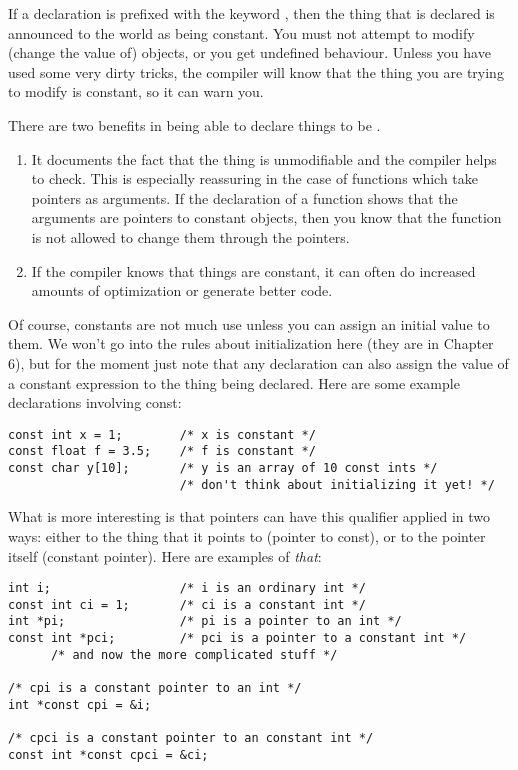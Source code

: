    If a declaration is prefixed with the keyword \const, then
    the thing that is declared is announced to the world as being constant.
    You must not attempt to modify (change the value of) \const{}
    objects, or you get undefined behaviour. Unless you have used some very
    dirty tricks, the compiler will know that the thing you are trying to
    modify is constant, so it can warn you.


   There are two benefits in being able to declare things to be
    \const.


   \begin{enumerate}
    \item It documents the fact that the thing is unmodifiable and the
     compiler helps to check. This is especially reassuring in the case
     of functions which take pointers as arguments. If the declaration
     of a function shows that the arguments are pointers to constant
     objects, then you know that the function is not allowed to change
     them through the pointers.

    \item If the compiler knows that things are constant, it can often do
     increased amounts of optimization or generate better code.
   \end{enumerate}

   Of course, constants are not much use unless you can assign an initial
    value to them. We won't go into the rules about initialization here
    (they are in Chapter 6), but for the moment just note that
    any declaration can also assign the value of a constant expression to
    the thing being declared. Here are some example declarations involving
    const:


   \begin{Verbatim}
const int x = 1;        /* x is constant */
const float f = 3.5;    /* f is constant */
const char y[10];       /* y is an array of 10 const ints */
                        /* don't think about initializing it yet! */
\end{Verbatim}

   What is more interesting is that pointers can have this qualifier
    applied in two ways: either to the thing that it points to (pointer to
    const), or to the pointer itself (constant pointer). Here are examples
    of \textit{that}:


   \begin{Verbatim}
int i;                  /* i is an ordinary int */
const int ci = 1;       /* ci is a constant int */
int *pi;                /* pi is a pointer to an int */
const int *pci;         /* pci is a pointer to a constant int */
      /* and now the more complicated stuff */

/* cpi is a constant pointer to an int */
int *const cpi = &i;

/* cpci is a constant pointer to an constant int */
const int *const cpci = &ci;
\end{Verbatim}

